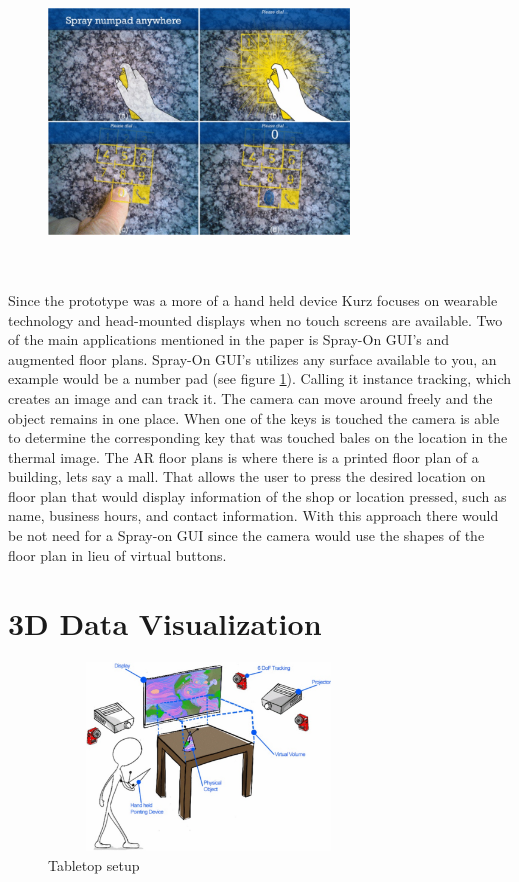 \documentclass{sig-alternate}
\begin{document}
\begin{figure}
	\includegraphics[width=8cm, height=8cm]{numpad}
	\caption{ \cite{Thermal}}
	\label{fig:numpad}
\end{figure}


Since the prototype was a more of a hand held device Kurz focuses on wearable technology and head-mounted displays when no touch screens are available. Two of the main applications mentioned in the paper is Spray-On GUI's and augmented floor plans. Spray-On GUI's utilizes any surface available to you, an example would be a number pad (see figure \ref{fig:numpad}). Calling it instance tracking, which creates an image and can track it. The camera can move around freely and the object remains in one place. When one of the keys is touched the camera is able to determine the corresponding key that was touched bales on the location in the thermal image. The AR floor plans is where there is a printed floor plan of a building, lets say a mall. That allows the user to press the desired location on floor plan that would display information of the shop or location pressed, such as name, business hours, and contact information. With this approach there would be not need for a Spray-on GUI since the camera would use the shapes of the floor plan in lieu of virtual buttons.          


\section{3D Data Visualization}
\label{sec:3D Data Visualization}

\begin{figure}
	\includegraphics[width=8.5cm, height=5cm]{Tabletop}
	\caption{Tabletop setup \cite{3D}}
	\label{fig:Tabletop}
\end{figure}
\end{document}

